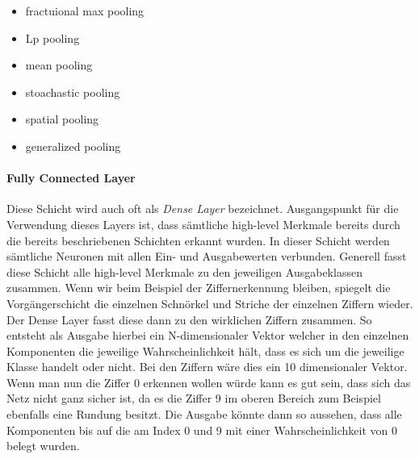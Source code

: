 \begin{itemize}
\item fractuional max pooling
\item Lp pooling
\item mean pooling
\item stoachastic pooling
\item spatial pooling
\item generalized pooling
\end{itemize}


\paragraph{Fully Connected Layer}
Diese Schicht wird auch oft als \emph{Dense Layer} bezeichnet. Ausgangspunkt für die Verwendung dieses Layers ist, dass sämtliche high-level Merkmale bereits durch die bereits beschriebenen Schichten erkannt wurden. In dieser Schicht werden sämtliche Neuronen mit allen Ein- und Ausgabewerten verbunden. Generell fasst diese Schicht alle high-level Merkmale zu den jeweiligen Ausgabeklassen zusammen. Wenn wir beim Beispiel der Ziffernerkennung bleiben, spiegelt die Vorgängerschicht die einzelnen Schnörkel und Striche der einzelnen Ziffern wieder. Der Dense Layer fasst diese dann zu den wirklichen Ziffern zusammen. So entsteht als Ausgabe hierbei ein N-dimensionaler Vektor welcher in den einzelnen Komponenten die jeweilige Wahrscheinlichkeit hält, dass es sich um die jeweilige Klasse handelt oder nicht. Bei den Ziffern wäre dies ein 10 dimensionaler Vektor. Wenn man nun die Ziffer 0 erkennen wollen würde kann es gut sein, dass sich das Netz \glqq nicht ganz sicher \grqq ist, da es die Ziffer 9 im oberen Bereich zum Beispiel ebenfalls eine Rundung besitzt. Die Ausgabe könnte dann so aussehen, dass alle Komponenten bis auf die am Index 0 und 9 mit einer Wahrscheinlichkeit von 0 belegt wurden. 

